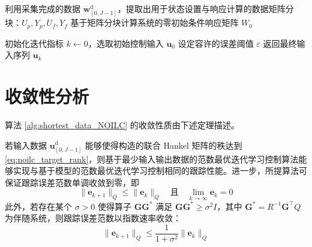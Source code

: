 \begin{algorithm}[H]
	利用采集完成的数据 $\mathbf{w}^{\mathrm{d}}_{[0,J-1]}$，提取出用于状态设置与响应计算的数据矩阵分块：$U_p, Y_p, U_f, Y_f$\;
	基于矩阵分块计算系统的零初始条件响应矩阵 $W_0$\;
	
	\BlankLine
	初始化迭代指标 $k \leftarrow 0$，选取初始控制输入 $\mathbf{u}_0$\;
	设定容许的误差阈值 $\varepsilon$\;
	返回最终输入序列 $\mathbf{u}_k$
\end{algorithm}

\section{收敛性分析}

算法 \ref{alg:shortest_data_NOILC} 的收敛性质由下述定理描述。

\begin{theorem}
	\label{thm:convergence}
	若输入数据 \( \mathbf{u}^{\mathrm{d}}_{[0,J-1]} \) 能够使得构造的联合 Hankel 矩阵的秩达到\eqref{eq:noilc_target_rank}，则基于最少输入输出数据的范数最优迭代学习控制算法能够实现与基于模型的范数最优迭代学习控制相同的跟踪性能。进一步，所提算法可保证跟踪误差范数单调收敛到零，即
	\begin{equation}
		\|\mathbf{e}_{k+1}\|_Q \leq \|\mathbf{e}_k\|_Q \quad \text{且} \quad \lim_{k \to \infty} \mathbf{e}_k = 0
		\label{eq:monotonic_convergence}
	\end{equation}
	此外，若存在某个 $\sigma > 0$ 使得算子 $\mathbf{G}\mathbf{G}^*$ 满足 \( \mathbf{G} \mathbf{G}^* \geq \sigma^2 I \)，其中 \( \mathbf{G}^* = R^{-1} \mathbf{G}^\top Q \) 为伴随系统，则跟踪误差范数以指数速率收敛：
	\begin{equation}
		\|\mathbf{e}_{k+1}\|_Q \leq \frac{1}{1 + \sigma^2} \|\mathbf{e}_k\|_Q
		\label{eq:exponential_convergence}
	\end{equation}
\end{theorem}

